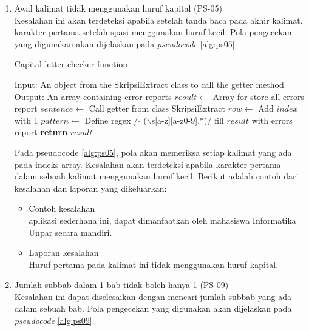 \begin{enumerate}
	\item Awal kalimat tidak menggunakan huruf kapital (PS-05) \\
	Kesalahan ini akan terdeteksi apabila setelah tanda baca pada akhir kalimat, karakter pertama setelah spasi menggunakan huruf kecil. Pola pengecekan yang digunakan akan dijelaskan pada \textit{pseudocode} \ref{alg:ps05}.

\begin{minipage}{1.0\linewidth}
\begin{algorithm}[H]
    \caption{Capital letter checker function}
	\label{alg:ps05}
	\begin{algorithmic}[1]
    		\State Input: An object from the SkripsiExtract class to call the getter method
			\State Output: An array containing error reports
			\State $result \gets$ Array for store all errors report
			\State $sentence \gets$ Call getter from class SkripsiExtract
    			\State $row \gets$ Add $index$ with 1
				\State $pattern \gets$ Define regex / $\hat{}$ ($\backslash$s[a-z][a-z0-9].*)/
                	\State fill $result$ with errors report
            	\EndIf
        	\EndFor
    		\State \textbf{return} $result$
    	\EndFunction
	\end{algorithmic}
\end{algorithm}
\end{minipage}
\medskip

	Pada pseudocode \ref{alg:ps05}, pola akan memeriksa setiap kalimat yang ada pada indeks array. Kesalahan akan terdeteksi apabila karakter pertama dalam sebuah kalimat menggunakan huruf kecil. Berikut adalah contoh dari kesalahan dan laporan yang dikeluarkan:
	
	\begin{itemize}
		\item Contoh kesalahan \\ 
		aplikasi sederhana ini, dapat dimanfaatkan oleh mahasiswa Informatika Unpar secara mandiri.
		\item Laporan kesalahan \\
		Huruf pertama pada kalimat ini tidak menggunakan huruf kapital.
	\end{itemize}
	
	\item Jumlah subbab dalam 1 bab tidak boleh hanya 1 (PS-09) \\
	Kesalahan ini dapat diselesaikan dengan mencari jumlah subbab yang ada dalam sebuah bab. Pola pengecekan yang digunakan akan dijelaskan pada \textit{pseudocode} \ref{alg:ps09}.


\end{enumerate}
